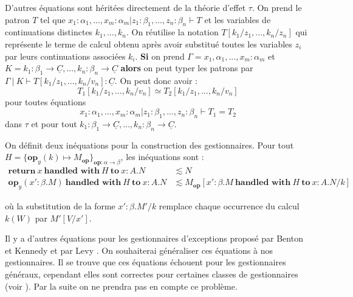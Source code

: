 
D'autres équations sont héritées directement de la théorie d'effet $\tau$. On prend le patron $T$ tel que $x_1:\alpha_1,...,x_m:\alpha_m|z_1:\beta_1,...,z_n:\beta_n \vdash T$ et les variables de continuations distinctes $k_1,...,k_n$. On réutilise la notation $T[k_1/z_1,...,k_n/z_n]$  qui représente le terme de calcul obtenu après avoir substitué toutes les variables $z_i$ par leurs continuations associées $k_i$. 
\medbreak
\textbf{Si} on prend $\Gamma = x_1,\alpha_1,...,x_m:\alpha_m$ et $K = k_1:\beta_1 \rightarrow \underline{C},...,k_n:\beta_n \rightarrow \underline{C}$ \textbf{alors} on peut typer les patrons par $\Gamma~|~K \vdash T[k_1/z_1,...,k_n/v_n]:\underline{C}$. On peut donc avoir :
\[T_1[k_1/z_1,...,k_n/v_n] \simeq T_2[k_1/z_1,...,k_n/v_n]\]
pour toutes équations 
\[x_1:\alpha_1,...,x_m:\alpha_m|z_1:\beta_1,...,z_n:\beta_n \vdash T_1 = T_2\]
dans $\tau$ et pour tout $k_1:\beta_1 \rightarrow \underline{C},...,k_n:\beta_n \rightarrow \underline{C}$.

On définit deux inéquations pour la construction des gestionnaires. 
Pour tout $H = \{\textbf{op}_y(k) \mapsto M_\textbf{op}\}_{\textbf{op}:\alpha \rightarrow \beta}$, les inéquations sont : 
\begin{align*}
	\textbf{return}~x~\textbf{handled~with}~H~\textbf{to}~x:A.N  &\lesssim N\\
	\textbf{op}_y(x':\beta.M)~\textbf{handled~with}~H~\textbf{to}~x:A.N&\lesssim M_\textbf{op}[x':\beta.M~\textbf{handled~with}~H~\textbf{to}~x:A.N/k]
\end{align*}
	
où la substitution de la forme $x':\beta.M'/k$ remplace chaque occurrence du calcul $k(W)$ par $M'[V/x']$. 


Il y a d'autres équations pour les gestionnaires d'exceptions proposé par Benton et Kennedy \cite{DBLP:journals/jfp/BentonK01} et par Levy \cite{DBLP:journals/entcs/Levy06a}. On souhaiterai généraliser ces équations à nos gestionnaires. Il se trouve que ces équations échouent pour les gestionnaires généraux, cependant elles sont correctes pour certaines classes de gestionnaires (voir \cite{DBLP:conf/lics/PlotkinP08}). Par la suite on ne prendra pas en compte ce problème.
\smallbreak

